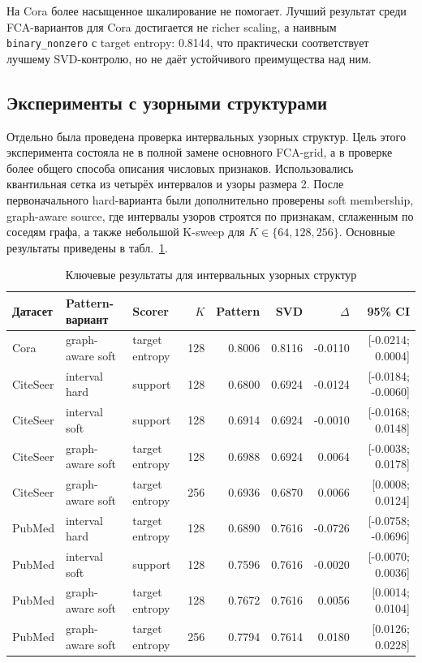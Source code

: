 \documentclass[14pt,a4paper]{extarticle}
\begin{document}
На Cora более насыщенное шкалирование не помогает. Лучший результат среди
FCA-вариантов для Cora достигается не richer scaling, а наивным
\texttt{binary\_nonzero} с target entropy: 0.8144, что практически соответствует
лучшему SVD-контролю, но не даёт устойчивого преимущества над ним.

\subsection{Эксперименты с узорными структурами}

Отдельно была проведена проверка интервальных узорных структур. Цель этого
эксперимента состояла не в полной замене основного FCA-grid, а в проверке более
общего способа описания числовых признаков. Использовались квантильная сетка из
четырёх интервалов и узоры размера 2. После первоначального hard-варианта были
дополнительно проверены soft membership, graph-aware source, где интервалы узоров
строятся по признакам, сглаженным по соседям графа, а также небольшой K-sweep для
$K \in \{64,128,256\}$. Основные результаты приведены в
табл.~\ref{tab:pattern_structures}.

\begin{table}[H]
\centering
\small
\caption{Ключевые результаты для интервальных узорных структур}
\label{tab:pattern_structures}
\begin{tabular}{lllrrrrr}
\toprule
Датасет & Pattern-вариант & Scorer & $K$ & Pattern & SVD & $\Delta$ & 95\% CI \\
\midrule
Cora & graph-aware soft & target entropy & 128 & 0.8006 & 0.8116 & -0.0110 & [-0.0214; 0.0004] \\
CiteSeer & interval hard & support & 128 & 0.6800 & 0.6924 & -0.0124 & [-0.0184; -0.0060] \\
CiteSeer & interval soft & support & 128 & 0.6914 & 0.6924 & -0.0010 & [-0.0168; 0.0148] \\
CiteSeer & graph-aware soft & target entropy & 128 & 0.6988 & 0.6924 & 0.0064 & [-0.0038; 0.0178] \\
CiteSeer & graph-aware soft & target entropy & 256 & 0.6936 & 0.6870 & 0.0066 & [0.0008; 0.0124] \\
PubMed & interval hard & target entropy & 128 & 0.6890 & 0.7616 & -0.0726 & [-0.0758; -0.0696] \\
PubMed & interval soft & support & 128 & 0.7596 & 0.7616 & -0.0020 & [-0.0070; 0.0036] \\
PubMed & graph-aware soft & target entropy & 128 & 0.7672 & 0.7616 & 0.0056 & [0.0014; 0.0104] \\
PubMed & graph-aware soft & target entropy & 256 & 0.7794 & 0.7614 & 0.0180 & [0.0126; 0.0228] \\
\bottomrule
\end{tabular}
\end{table}
\normalsize
\end{document}
